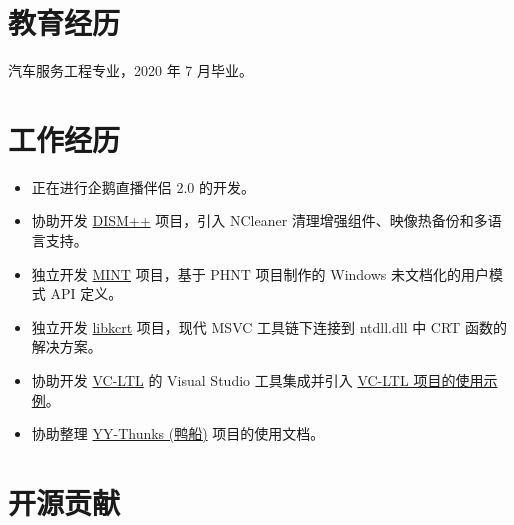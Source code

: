 \documentclass{resume}
\begin{document}
\renewcommand\headrulewidth{0pt}



\section{教育经历}

  汽车服务工程专业，2020 年 7 月毕业。

\section{工作经历}

\begin{itemize}
  \item 正在进行企鹅直播伴侣 2.0 的开发。
\end{itemize}

\begin{itemize}
  \item 协助开发 \href{http://www.chuyu.me/zh-Hans/index.html}{DISM++} 项目，引入 NCleaner 清理增强组件、映像热备份和多语言支持。
  \item 独立开发 \href{https://github.com/Chuyu-Team/MINT}{MINT} 项目，基于 PHNT 项目制作的 Windows 未文档化的用户模式 API 定义。
  \item 独立开发 \href{https://github.com/Chuyu-Team/libkcrt}{libkcrt} 项目，现代 MSVC 工具链下连接到 ntdll.dll 中 CRT 函数的解决方案。
  \item 协助开发 \href{https://github.com/Chuyu-Team/VC-LTL}{VC-LTL} 的 Visual Studio 工具集成并引入 \href{https://github.com/Chuyu-Team/vc-ltl-samples}{VC-LTL 项目的使用示例}。
  \item 协助整理 \href{https://github.com/Chuyu-Team/YY-Thunks}{YY-Thunks (鸭船)} 项目的使用文档。
\end{itemize}

\section{开源贡献}
\end{document}
